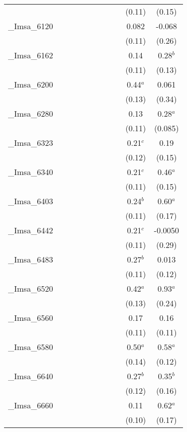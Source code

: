 \documentclass[]{article}
\begin{document}
\begin{tabular}{lcccccccccc}
 &  &  &  &  &  &  &  &  & (0.11) & (0.15) \\
\_Imsa\_6120 &  &  &  &  &  &  &  &  & 0.082 & -0.068 \\
 &  &  &  &  &  &  &  &  & (0.11) & (0.26) \\
\_Imsa\_6162 &  &  &  &  &  &  &  &  & 0.14 & 0.28$^b$ \\
 &  &  &  &  &  &  &  &  & (0.11) & (0.13) \\
\_Imsa\_6200 &  &  &  &  &  &  &  &  & 0.44$^a$ & 0.061 \\
 &  &  &  &  &  &  &  &  & (0.13) & (0.34) \\
\_Imsa\_6280 &  &  &  &  &  &  &  &  & 0.13 & 0.28$^a$ \\
 &  &  &  &  &  &  &  &  & (0.11) & (0.085) \\
\_Imsa\_6323 &  &  &  &  &  &  &  &  & 0.21$^c$ & 0.19 \\
 &  &  &  &  &  &  &  &  & (0.12) & (0.15) \\
\_Imsa\_6340 &  &  &  &  &  &  &  &  & 0.21$^c$ & 0.46$^a$ \\
 &  &  &  &  &  &  &  &  & (0.11) & (0.15) \\
\_Imsa\_6403 &  &  &  &  &  &  &  &  & 0.24$^b$ & 0.60$^a$ \\
 &  &  &  &  &  &  &  &  & (0.11) & (0.17) \\
\_Imsa\_6442 &  &  &  &  &  &  &  &  & 0.21$^c$ & -0.0050 \\
 &  &  &  &  &  &  &  &  & (0.11) & (0.29) \\
\_Imsa\_6483 &  &  &  &  &  &  &  &  & 0.27$^b$ & 0.013 \\
 &  &  &  &  &  &  &  &  & (0.11) & (0.12) \\
\_Imsa\_6520 &  &  &  &  &  &  &  &  & 0.42$^a$ & 0.93$^a$ \\
 &  &  &  &  &  &  &  &  & (0.13) & (0.24) \\
\_Imsa\_6560 &  &  &  &  &  &  &  &  & 0.17 & 0.16 \\
 &  &  &  &  &  &  &  &  & (0.11) & (0.11) \\
\_Imsa\_6580 &  &  &  &  &  &  &  &  & 0.50$^a$ & 0.58$^a$ \\
 &  &  &  &  &  &  &  &  & (0.14) & (0.12) \\
\_Imsa\_6640 &  &  &  &  &  &  &  &  & 0.27$^b$ & 0.35$^b$ \\
 &  &  &  &  &  &  &  &  & (0.12) & (0.16) \\
\_Imsa\_6660 &  &  &  &  &  &  &  &  & 0.11 & 0.62$^a$ \\
 &  &  &  &  &  &  &  &  & (0.10) & (0.17) \\

\end{tabular}
\end{document}
